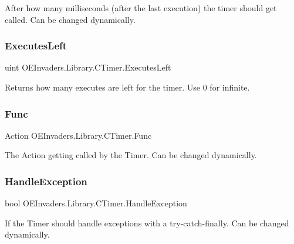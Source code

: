 After how many milliseconds (after the last execution) the timer should get called. Can be changed dynamically. 

\mbox{\label{class_o_e_invaders_1_1_library_1_1_c_timer_a80808297554224ddb4dc8fa9c72d9434}} 
\subsubsection{\texorpdfstring{ExecutesLeft}{ExecutesLeft}}
{\footnotesize\ttfamily uint O\+E\+Invaders.\+Library.\+C\+Timer.\+Executes\+Left}



Returns how many executes are left for the timer. Use 0 for infinite. 

\mbox{\label{class_o_e_invaders_1_1_library_1_1_c_timer_a7bbc9467a211fe1cc9bf2974d00f693b}} 
\subsubsection{\texorpdfstring{Func}{Func}}
{\footnotesize\ttfamily Action O\+E\+Invaders.\+Library.\+C\+Timer.\+Func}



The Action getting called by the Timer. Can be changed dynamically. 

\mbox{\label{class_o_e_invaders_1_1_library_1_1_c_timer_ac52011ba70e815c603b5b0c5a255721e}} 
\subsubsection{\texorpdfstring{HandleException}{HandleException}}
{\footnotesize\ttfamily bool O\+E\+Invaders.\+Library.\+C\+Timer.\+Handle\+Exception}



If the Timer should handle exceptions with a try-\/catch-\/finally. Can be changed dynamically. 



